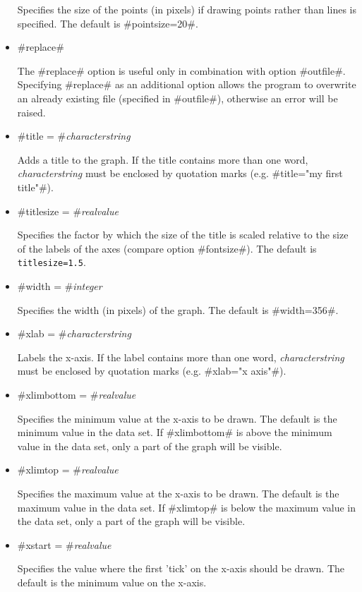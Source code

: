 \begin{itemize}
Specifies the size of the points (in pixels) if drawing points
rather than lines is specified. The default is #pointsize=20#.

\item #replace#

The #replace# option is useful only in combination with option
#outfile#. Specifying #replace# as an additional option allows the
program to overwrite an already existing file (specified in
#outfile#), otherwise an error will be raised.

\item #title = #{\em characterstring}

Adds a title to the graph. If the title contains more than one
word, {\em characterstring} must be enclosed by quotation marks (e.g.
#title="my first title"#).

\item #titlesize = #{\em realvalue}

Specifies the factor by which the size of the title is scaled
relative to the size of the labels of the axes (compare option
#fontsize#). The default is \texttt{titlesize=1.5}.

\item #width = #{\em integer}

Specifies the width (in pixels) of the graph. The default is
#width=356#.

\item #xlab = #{\em characterstring}

Labels the x-axis. If the label contains more than one word, {\em
characterstring} must be enclosed by quotation marks (e.g.
#xlab="x axis"#).

\item #xlimbottom = #{\em realvalue}

Specifies the minimum value at the x-axis to be drawn. The default
is the minimum value in the data set. If #xlimbottom# is above the
minimum value in the data set, only a part of the  graph will be
visible.

\item #xlimtop = #{\em realvalue}

Specifies the maximum value at the x-axis to be drawn. The default
is the maximum value in the data set. If #xlimtop# is below the
maximum value in the data set, only a part of the  graph will be
visible.

\item #xstart = #{\em realvalue}

Specifies the value where the first 'tick' on the x-axis should be
drawn. The default is the minimum value on the x-axis.


\end{itemize}
